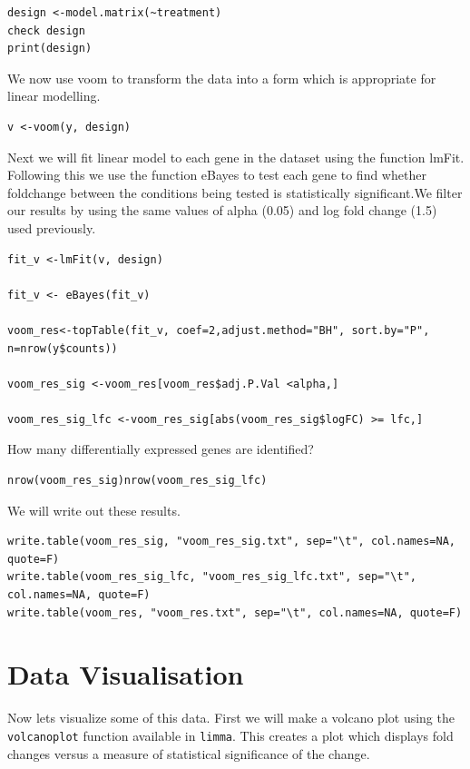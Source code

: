 \begin{steps}
\begin{steps}
\begin{lstlisting}
design <-model.matrix(~treatment)
check design
print(design)
\end{lstlisting}
We now use voom to transform the data into a form which is appropriate for linear modelling.
\begin{lstlisting}
v <-voom(y, design)
\end{lstlisting}
\end{steps}
Next we will fit linear model to each gene in the dataset using the function lmFit.  Following this we use the function eBayes to test  each gene to find whether foldchange between the conditions being tested is statistically significant.We filter our results by using the same values of alpha (0.05) and log fold change (1.5) used previously.

\begin{steps}
\begin{lstlisting}
fit_v <-lmFit(v, design) 

fit_v <- eBayes(fit_v)

voom_res<-topTable(fit_v, coef=2,adjust.method="BH", sort.by="P", n=nrow(y$counts)) 

voom_res_sig <-voom_res[voom_res$adj.P.Val <alpha,]

voom_res_sig_lfc <-voom_res_sig[abs(voom_res_sig$logFC) >= lfc,]
\end{lstlisting}
\end{steps}

How many differentially expressed genes are identified?

\begin{steps}
\begin{lstlisting}nrow(voom_res_sig)nrow(voom_res_sig_lfc)
\end{lstlisting}
\end{steps}
We will write out these results.

\begin{steps}
\begin{lstlisting}
write.table(voom_res_sig, "voom_res_sig.txt", sep="\t", col.names=NA, quote=F)
write.table(voom_res_sig_lfc, "voom_res_sig_lfc.txt", sep="\t", col.names=NA, quote=F)
write.table(voom_res, "voom_res.txt", sep="\t", col.names=NA, quote=F) 
\end{lstlisting}
\end{steps}

\section{Data Visualisation}
Now let\’s visualize some of this data. First we will make a volcano plot using the \texttt{volcanoplot} function available in \texttt{limma}. This creates a plot which displays fold changes versus a measure of statistical significance of the change.


\end{steps}
